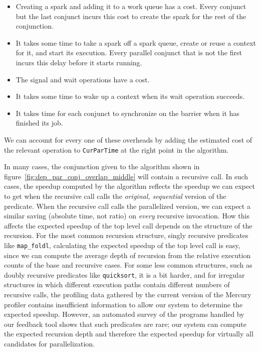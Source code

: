 \begin{itemize}
\item
Creating a spark and adding it to a work queue has a cost.
Every conjunct but the last conjunct incurs this cost
to create the spark for the rest of the conjunction.
\item
It takes some time to take a spark off a spark queue,
create or reuse a context for it, and start its execution.
Every parallel conjunct that is not the first incurs this delay
before it starts running.
\item
The signal and wait operations have a cost.
\item
It takes some time to wake up a context when its wait operation succeeds.
\item
It takes time for each conjunct to synchronize on the barrier
when it has finished its job.
\end{itemize}

\noindent
We can account for every one of these overheads
by adding the estimated cost of the relevant operation to \verb|CurParTime|
at the right point in the algorithm.

In many cases,
the conjunction given to the algorithm shown in figure~\ref{fig:dep_par_conj_overlap_middle}
will contain a recursive call.
In such cases, the speedup computed by the algorithm
reflects the speedup we can expect to get when the recursive call
calls the \emph{original, sequential} version of the predicate.
When the recursive call calls the parallelized version,
we can expect a similar saving (absolute time, not ratio)
on \emph{every} recursive invocation.
How this affects the expected speedup of the top level call
depends on the structure of the recursion.
For the most common recursion structure,
singly recursive predicates like \verb|map_foldl|,
calculating the expected speedup of the top level call is easy,
since we can compute the average depth of recursion
from the relative execution counts of the base and recursive cases.
For some less common structures,
such as doubly recursive predicates like \verb|quicksort|, it is a bit harder,
and for irregular structures in which different execution paths
contain different numbers of recursive calls,
the profiling data gathered by the current version of the Mercury profiler
contains insufficient information to allow our system to determine the
expected speedup.
However, an automated survey of the programs handled by our feedback tool
shows that such predicates are rare;
our system can compute
the expected recursion depth and therefore the expected speedup
for virtually all candidates for parallelization.

